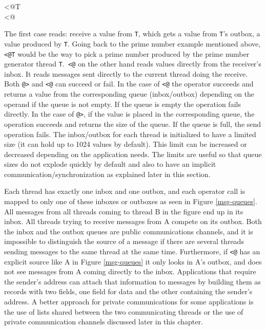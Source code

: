\begin{iconcode}
<@T\\
<@\\
\end{iconcode}

The first case reads: receive a value from \texttt{T}, which gets a value
from \texttt{T}'s outbox, a value produced by \texttt{T}. Going back to the
prime number example mentioned above, \texttt{<@T} would be the way to pick
a prime number produced by the prime number generator thread
\texttt{T}.\texttt{ <@} on the other hand reads values directly from the
receiver's inbox.  It reads messages sent directly to the current thread
doing the receive.  Both \texttt{@>} and \texttt{<@} can succeed or
fail. In the case of \texttt{<@} the operator succeeds and returns a value
from the corresponding queue (inbox/outbox) depending on the operand if the
queue is not empty. If the queue is empty the operation fails directly.  In
the case of \texttt{@>}, if the value is placed in the corresponding queue,
the operation succeeds and returns the size of the queue. If the queue is
full, the send operation fails. The inbox/outbox for each thread is
initialized to have a limited size (it can hold up to 1024 values by
default). This limit can be increased or decreased depending on the
application needs. The limits are useful so that queue sizes do not explode
quickly by default and also to have an implicit
communication/synchronization as explained later in this section.

Each thread has exactly one inbox and one outbox, and each operator call is
mapped to only one of these inboxes or outboxes as seen in Figure \ref{msg-queues}.
All messages from all threads coming to thread B in the figure
end up in its inbox. All threads trying to receive messages from A compete
on its outbox. Both the inbox and the outbox queues are public
communications channels, and it is impossible to distinguish the source of
a message if there are several threads sending messages to the same thread
at the same time. Furthermore, if \texttt{<@} has an explicit source like A in
Figure \ref{msg-queues} it only looks in A's outbox, and does not see messages from A
coming directly to the inbox. Applications that require the sender's
address can attach that information to messages by building them as records
with two fields, one field for data and the other containing the sender's
address. A better approach for private communications for some applications
is the use of lists shared between the two communicating threads or the use
of private communication channels discussed later in this chapter.

